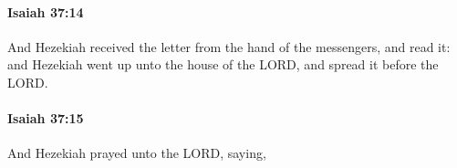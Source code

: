 		\paragraph{Isaiah 37:14} %
			\label{ISAIAH-37-14}

			And Hezekiah received the letter from the hand of the messengers, and read it: and Hezekiah went up unto the house of the LORD, and spread it before the LORD.


		\paragraph{Isaiah 37:15} %
			\label{ISAIAH-37-15}

			And Hezekiah prayed unto the LORD, saying,


